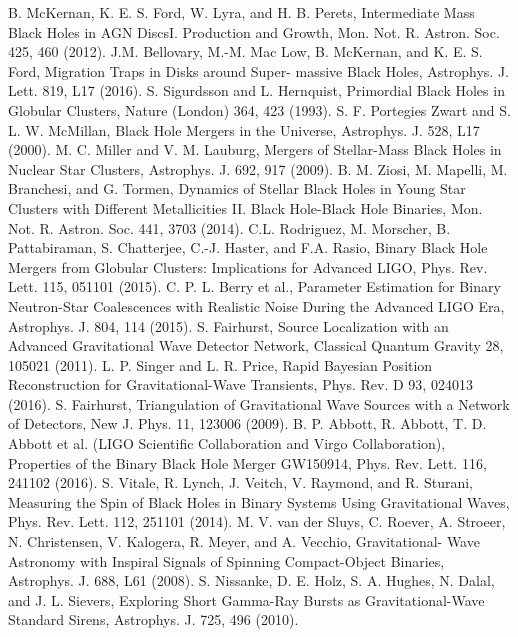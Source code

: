 \documentclass[binding=0.6cm, LaM]{sapthesis}
\begin{document}
\begin{thebibliography}{500}
          B. McKernan, K. E. S. Ford, W. Lyra, and H. B. Perets, Intermediate Mass Black Holes in AGN DiscsI. Production and Growth, Mon. Not. R. Astron. Soc. 425, 460 (2012).
          J.M. Bellovary, M.-M. Mac Low, B. McKernan, and K. E. S. Ford, Migration Traps in Disks around Super- massive Black Holes, Astrophys. J. Lett. 819, L17 (2016).
          S. Sigurdsson and L. Hernquist, Primordial Black Holes in Globular Clusters, Nature (London) 364, 423 (1993).
         S. F. Portegies Zwart and S. L. W. McMillan, Black Hole Mergers in the Universe, Astrophys. J. 528, L17 (2000).
         M. C. Miller and V. M. Lauburg, Mergers of Stellar-Mass Black Holes in Nuclear Star Clusters, Astrophys. J. 692, 917 (2009).
         B. M. Ziosi, M. Mapelli, M. Branchesi, and G. Tormen, Dynamics of Stellar Black Holes in Young Star Clusters with Different Metallicities II. Black Hole-Black Hole Binaries, Mon. Not. R. Astron. Soc. 441, 3703 (2014).
          C.L. Rodriguez, M. Morscher, B. Pattabiraman, S. Chatterjee, C.-J. Haster, and F.A. Rasio, Binary Black Hole Mergers from Globular Clusters: Implications for Advanced LIGO, Phys. Rev. Lett. 115, 051101 (2015).
          C. P. L. Berry et al., Parameter Estimation for Binary Neutron-Star Coalescences with Realistic Noise During the Advanced LIGO Era, Astrophys. J. 804, 114 (2015).
 	 S. Fairhurst, Source Localization with an Advanced Gravitational Wave Detector Network, Classical Quantum Gravity 28, 105021 (2011).
          L. P. Singer and L. R. Price, Rapid Bayesian Position Reconstruction for Gravitational-Wave Transients, Phys. Rev. D 93, 024013 (2016).
   	 S. Fairhurst, Triangulation of Gravitational Wave Sources with a Network of Detectors, New J. Phys. 11, 123006 (2009).
    	 B. P. Abbott, R. Abbott, T. D. Abbott et al. (LIGO Scientific Collaboration and Virgo Collaboration), Properties of the Binary Black Hole Merger GW150914, Phys. Rev. Lett. 116, 241102 (2016).
 	 S. Vitale, R. Lynch, J. Veitch, V. Raymond, and R. Sturani, Measuring the Spin of Black Holes in Binary Systems Using Gravitational Waves, Phys. Rev. Lett. 112, 251101 (2014). 
 	 M. V. van der Sluys, C. Roever, A. Stroeer, N. Christensen, V. Kalogera, R. Meyer, and A. Vecchio, Gravitational- Wave Astronomy with Inspiral Signals of Spinning Compact-Object Binaries,        Astrophys. J. 688, L61 (2008).
         S. Nissanke, D. E. Holz, S. A. Hughes, N. Dalal, and J. L. Sievers, Exploring Short Gamma-Ray Bursts as Gravitational-Wave Standard Sirens, Astrophys. J. 725, 496 (2010).

\end{thebibliography}
\end{document}
